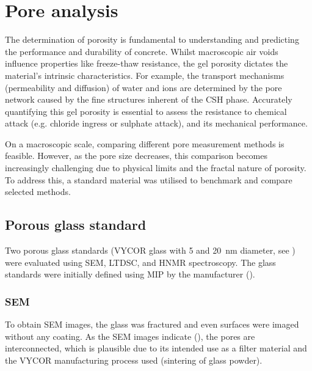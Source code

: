 \chapter{Pore analysis}

The determination of porosity is fundamental to understanding and predicting the performance and durability of concrete.
Whilst macroscopic air voids influence properties like freeze-thaw resistance, the gel porosity dictates the material's intrinsic characteristics.
For example, the transport mechanisms (permeability and diffusion) of water and ions are determined by the pore network caused by the fine structures inherent of the \ac{CSH} phase.
Accurately quantifying this gel porosity is essential to assess the resistance to chemical attack (e.g. chloride ingress or sulphate attack), and its mechanical performance.

On a macroscopic scale, comparing different pore measurement methods is feasible.
However, as the pore size decreases, this comparison becomes increasingly challenging due to physical limits and the fractal nature of porosity.
To address this, a standard material was utilised to benchmark and compare selected methods.

\section{Porous glass standard}

Two porous glass standards (\textsc{VYCOR} glass with \num{5} and \qty{20}{\nano\meter} diameter, see ) were evaluated using \ac{SEM}, \ac{LTDSC}, and \ac{HNMR} spectroscopy.
The glass standards were initially defined using \ac{MIP} by the manufacturer (). %

\subsection{\acs*{SEM}}

To obtain \ac{SEM} images, the glass was fractured and even surfaces were imaged without any coating.
As the \ac{SEM} images indicate (), the pores are interconnected, which is plausible due to its intended use as a filter material and the \textsc{VYCOR} manufacturing process used (sintering of glass powder).

